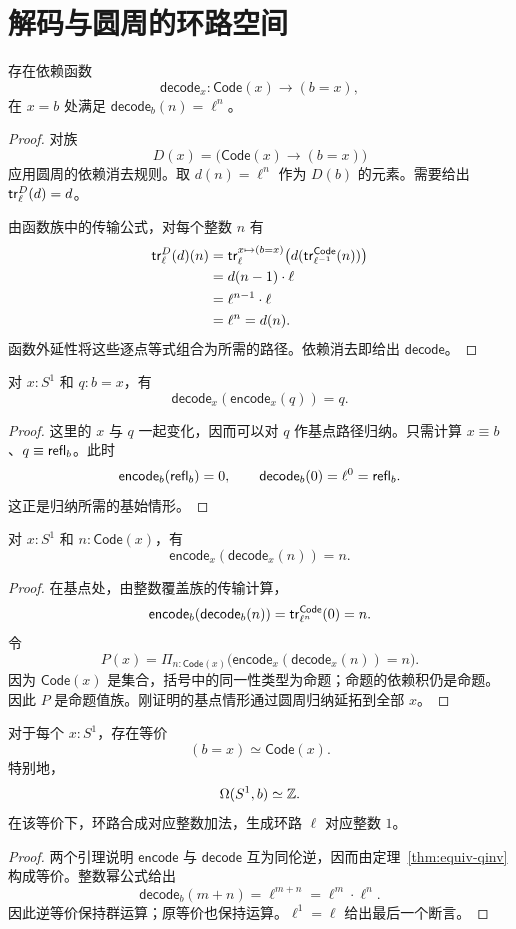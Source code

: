\section{解码与圆周的环路空间}

\begin{proposition}[解码的构造]
存在依赖函数
\[
 \mathsf{decode}_x:\mathsf{Code}(x)\to(b=x),
\]
在 $x=b$ 处满足 $\mathsf{decode}_b(n)=\ell^n$。
\end{proposition}
\begin{proof}
对族
\[
 D(x)=\bigl(\mathsf{Code}(x)\to(b=x)\bigr)
\]
应用圆周的依赖消去规则。取 $d(n)=\ell^n$ 作为 $D(b)$ 的元素。需要给出 $\mathsf{tr}^D_\ell(d)=d$。

由函数族中的传输公式，对每个整数 $n$ 有
\begin{align*}
 \mathsf{tr}^D_\ell(d)(n)
 &=\mathsf{tr}^{x\mapsto(b=x)}_\ell
     \bigl(d(\mathsf{tr}^{\mathsf{Code}}_{\ell^{-1}}(n))\bigr)\\
 &=d(n-1)\cdot\ell\\
 &=\ell^{n-1}\cdot\ell\\
 &=\ell^n=d(n).
\end{align*}
函数外延性将这些逐点等式组合为所需的路径。依赖消去即给出 $\mathsf{decode}$。
\end{proof}

\begin{lemma}[先编码后解码]
对 $x:S^1$ 和 $q:b=x$，有
\[
 \mathsf{decode}_x(\mathsf{encode}_x(q))=q.
\]
\end{lemma}
\begin{proof}
这里的 $x$ 与 $q$ 一起变化，因而可以对 $q$ 作基点路径归纳。只需计算 $x\equiv b$、$q\equiv\mathsf{refl}_b$。此时
\[
 \mathsf{encode}_b(\mathsf{refl}_b)=0,
 \qquad
 \mathsf{decode}_b(0)=\ell^0=\mathsf{refl}_b.
\]
这正是归纳所需的基始情形。
\end{proof}

\begin{lemma}[先解码后编码]
对 $x:S^1$ 和 $n:\mathsf{Code}(x)$，有
\[
 \mathsf{encode}_x(\mathsf{decode}_x(n))=n.
\]
\end{lemma}
\begin{proof}
在基点处，由整数覆盖族的传输计算，
\[
 \mathsf{encode}_b(\mathsf{decode}_b(n))
 =\mathsf{tr}^{\mathsf{Code}}_{\ell^n}(0)=n.
\]
令
\[
 P(x)=\Pi_{n:\mathsf{Code}(x)}
 \bigl(\mathsf{encode}_x(\mathsf{decode}_x(n))=n\bigr).
\]
因为 $\mathsf{Code}(x)$ 是集合，括号中的同一性类型为命题；命题的依赖积仍是命题。因此 $P$ 是命题值族。刚证明的基点情形通过圆周归纳延拓到全部 $x$。
\end{proof}

\begin{theorem}\label{thm:circle-encode}
对于每个 $x:S^1$，存在等价
\[
 (b=x)\simeq\mathsf{Code}(x).
\]
特别地，
\[
 \Omega(S^1,b)\simeq\mathbb Z.
\]
在该等价下，环路合成对应整数加法，生成环路 $\ell$ 对应整数 $1$。
\end{theorem}
\begin{proof}
两个引理说明 $\mathsf{encode}$ 与 $\mathsf{decode}$ 互为同伦逆，因而由定理~\ref{thm:equiv-qinv} 构成等价。整数幂公式给出
\[
 \mathsf{decode}_b(m+n)
 =\ell^{m+n}
 =\ell^m\cdot\ell^n.
\]
因此逆等价保持群运算；原等价也保持运算。$\ell^1=\ell$ 给出最后一个断言。
\end{proof}

